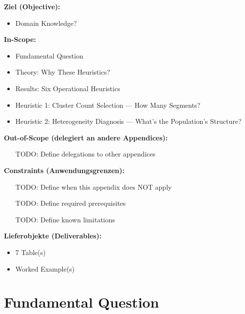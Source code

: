 \begin{tcolorbox}[
    colback=orange!5!white,
    colframe=orange!75!black,
    title={\textbf{Appendix Scope: Ziel / In-Scope / Out-of-Scope / Constraints}},
    fonttitle=\bfseries
]

\textbf{Ziel (Objective):}
\begin{itemize}[nosep]
    \item Domain Knowledge?
\end{itemize}

\textbf{In-Scope:}
\begin{itemize}[nosep]
    \item Fundamental Question
    \item Theory: Why These Heuristics?
    \item Results: Six Operational Heuristics
    \item Heuristic 1: Cluster Count Selection --- How Many Segments?
    \item Heuristic 2: Heterogeneity Diagnosis --- What's the Population's Structure?
\end{itemize}

\textbf{Out-of-Scope (delegiert an andere Appendices):}
\begin{itemize}[nosep]
    \item [TODO: Define delegations to other appendices]
\end{itemize}

\textbf{Constraints (Anwendungsgrenzen):}
\begin{itemize}[nosep]
    \item [TODO: Define when this appendix does NOT apply]
    \item [TODO: Define required prerequisites]
    \item [TODO: Define known limitations]
\end{itemize}

\textbf{Lieferobjekte (Deliverables):}
\begin{itemize}[nosep]
    \item 7 Table(s)
    \item Worked Example(s)
\end{itemize}

\end{tcolorbox}


\section{Fundamental Question}
\label{sec:h-fundamental}

